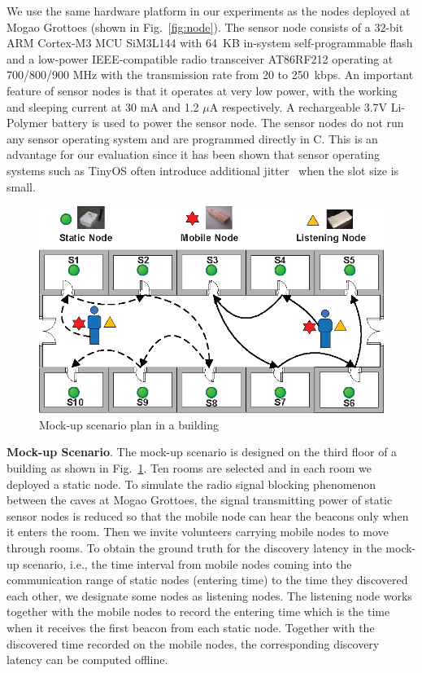\documentclass[twoside,twocolumn]{article}
\begin{document}
We use the same hardware platform in our experiments as the nodes deployed
at Mogao Grottoes (shown in Fig.~\ref{fig:node}). The sensor node 
consists of a 32-bit ARM Cortex-M3 MCU SiM3L144 with 64~KB in-system
self-programmable flash and a low-power IEEE-compatible radio transceiver 
AT86RF212 operating at 700/800/900 MHz with the transmission rate from 
20 to 250~kbps. An important feature of sensor nodes is that it operates
at very low power, with the working and sleeping current at 30 mA and 1.2 $\mu$A 
respectively. A rechargeable 3.7V Li-Polymer battery is used to power 
the sensor node. The sensor nodes do not run any sensor operating system
and are programmed directly in C. This is an advantage for our evaluation 
since it has been shown that sensor operating systems such as TinyOS often
introduce additional jitter~\citep{zhang2012acc} when the slot size is small.

\begin{figure}[t]
   \centering
   \includegraphics[width=.9\columnwidth]{static/mockupscenario}
   \caption{Mock-up scenario plan in a building}
   \label{fig:mockupsce}
\end{figure}



{\bf Mock-up Scenario}. The mock-up scenario is designed on the third floor of a
building as shown in Fig.~\ref{fig:mockupsce}. Ten rooms are selected and in each 
room we deployed a static node. To simulate the radio signal blocking phenomenon 
between the caves at Mogao Grottoes, the signal transmitting power of static sensor 
nodes is reduced so that the mobile node can hear the beacons only when it enters 
the room. Then we invite volunteers carrying mobile nodes to move through rooms. 
To obtain the ground truth for the discovery latency in the mock-up scenario, i.e.,
the time interval from mobile nodes coming into the communication range of static
nodes (entering time) to the time they discovered each other, we designate some
nodes as listening nodes. The listening node works together with the mobile nodes
to record the entering time which is the time when it receives the first beacon
from each static node. Together with the discovered time recorded on the mobile nodes,
the corresponding discovery latency can be computed offline.
\end{document}
